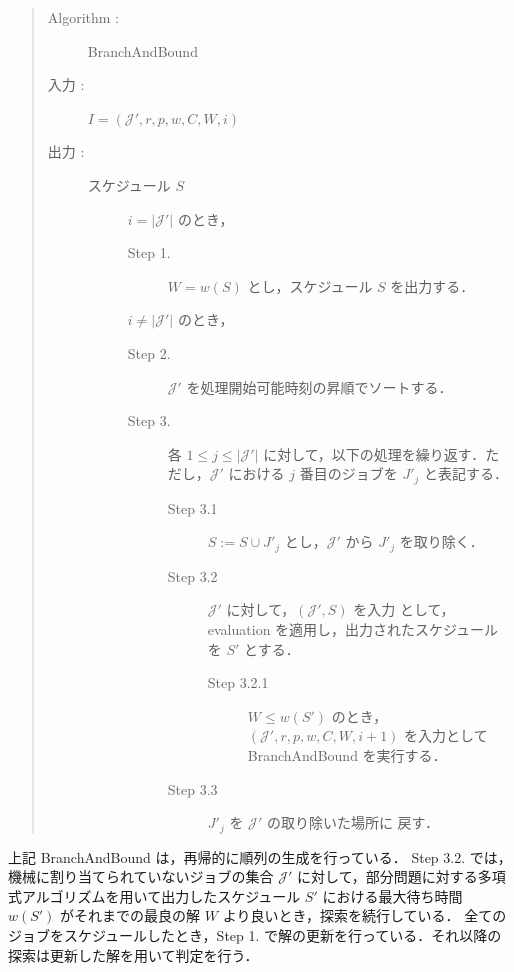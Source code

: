 \documentclass[12pt]{optlab-bachelor}
\begin{document}
\begin{quote}
  \begin{description}
    \item[{\sc Algorithm : }] {\sc BranchAndBound}
    \item[入力 :] $I = (\mathcal{J}',r,p,w,C,W,i)$
    \item[出力 :] スケジュール $S$
    \begin{description}
      \item[] $i = |\mathcal{J}'|$ のとき，
      \begin{description}
        \item[Step 1.] $W = w(S)$ とし，スケジュール $S$ を出力する．
      \end{description}
      \item[] $i \neq |\mathcal{J}'|$ のとき，
      \begin{description}
        \item[Step 2.] $\mathcal{J}'$ を処理開始可能時刻の昇順でソートする．
        \item[Step 3.] 各 $1 \le j \le |\mathcal{J}'|$ に対して，以下の処理を繰り返す．ただし，$\mathcal{J}'$ における $j$ 番目のジョブを $J'_j$ と表記する．
        \begin{description}
          \item[Step 3.1] $S := S \cup J'_j$ とし，$\mathcal{J}'$ から $J'_j$ を取り除く．
          \item[Step 3.2] $\mathcal{J}'$ に対して，$(\mathcal{J}',S)$ を入力
          として，{\sc evaluation} を適用し，出力されたスケジュールを $S'$ とする．
          \begin{description}
            \item[Step 3.2.1] $W \le w(S')$ のとき，$(\mathcal{J}',r,p,w,C,W,i + 1)$ を入力として {\sc BranchAndBound} を実行する．
          \end{description}
          \item[Step 3.3] $J'_j$ を $\mathcal{J}'$ の取り除いた場所に
          戻す．
        \end{description}
      \end{description}
    \end{description}
  \end{description}
\end{quote}

上記 {\sc BranchAndBound} は，再帰的に順列の生成を行っている．
Step 3.2. では，機械に割り当てられていないジョブの集合 $\mathcal{J}'$ に対して，部分問題に対する多項式アルゴリズムを用いて出力したスケジュール $S'$ における最大待ち時間 $w(S')$ がそれまでの最良の解 $W$ より良いとき，探索を続行している．
全てのジョブをスケジュールしたとき，Step 1. で解の更新を行っている．それ以降の探索は更新した解を用いて判定を行う．
\end{document}
